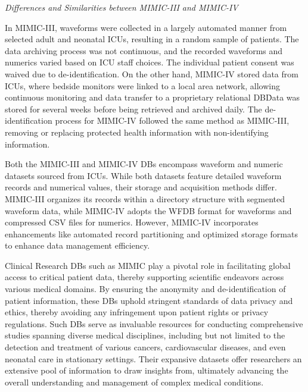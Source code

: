 \vspace{1cm}
\textit{Differences and Similarities between MIMIC-III and MIMIC-IV}
\vspace{0.2cm}

In MIMIC-III, waveforms were collected in a largely automated manner from selected adult and neonatal ICUs, resulting in a random sample of patients.
The data archiving process was not continuous, and the recorded waveforms and numerics varied based on ICU staff choices.
The individual patient consent was waived due to de-identification.
On the other hand, MIMIC-IV stored data from ICUs, where bedside monitors were linked to a local area network, allowing continuous monitoring and data transfer to a proprietary relational DB\.
Data was stored for several weeks before being retrieved and archived daily.
The de-identification process for MIMIC-IV followed the same method as MIMIC-III, removing or replacing protected health information with non-identifying information.

Both the MIMIC-III and MIMIC-IV DBs encompass waveform and numeric datasets sourced from ICUs.
While both datasets feature detailed waveform records and numerical values, their storage and acquisition methods differ.
MIMIC-III organizes its records within a directory structure with segmented waveform data, while MIMIC-IV adopts the \ac{WFDB} format for waveforms and compressed \ac{CSV} files for numerics.
However, MIMIC-IV incorporates enhancements like automated record partitioning and optimized storage formats to enhance data management efficiency.

\vspace{0.2cm}

Clinical Research DBs such as MIMIC play a pivotal role in facilitating global access to critical patient data, thereby supporting scientific endeavors across various medical domains.
By ensuring the anonymity and de-identification of patient information, these DBs uphold stringent standards of data privacy and ethics, thereby avoiding any infringement upon patient rights or privacy regulations.
Such DBs serve as invaluable resources for conducting comprehensive studies spanning diverse medical disciplines, including but not limited to the detection and treatment of various cancers, cardiovascular diseases, and even neonatal care in stationary settings.
Their expansive datasets offer researchers an extensive pool of information to draw insights from, ultimately advancing the overall understanding and management of complex medical conditions.

